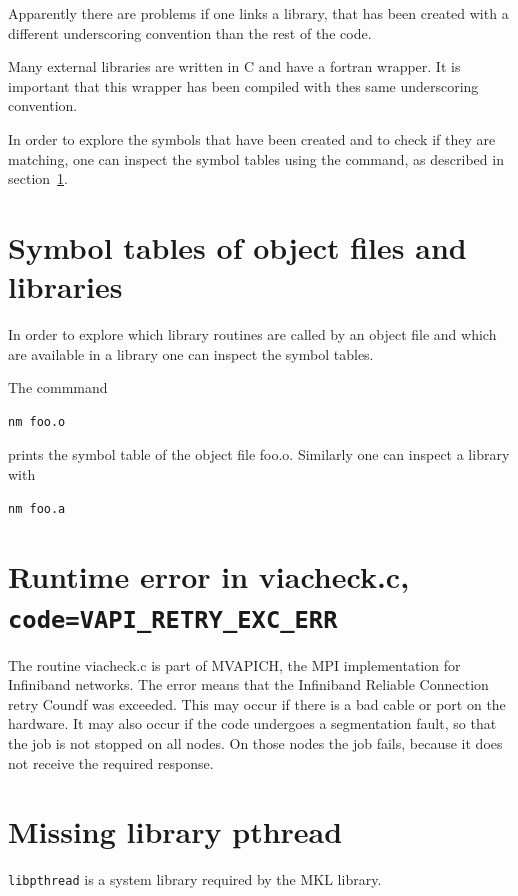 \documentclass[a4paper,10pt]{report}
\newcommand{\mytt}[1]{{\tt #1}}
\begin{document}
Apparently there are problems if one links a library, that has been
created with a different underscoring convention than the rest of the
code.

Many external libraries are written in C and have a fortran wrapper.
It is important that this wrapper has been compiled with thes same
underscoring convention.

In order to explore the symbols that have been created and to check if
they are matching, one can inspect the symbol tables using the
command, as described in section~\ref{sec:nm}.

\section{Symbol tables of object files and libraries}
\label{sec:nm}
In order to explore which library routines are called by an object
file and which are available in a library one can inspect the symbol
tables.

The commmand
\begin{verbatim}
nm foo.o
\end{verbatim}
 prints the symbol table of the object file foo.o.
Similarly one can inspect a library with 
\begin{verbatim}
nm foo.a
\end{verbatim}




\section{Runtime error in viacheck.c, \mytt{code=VAPI\_RETRY\_EXC\_ERR}}
The routine viacheck.c is part of MVAPICH, the MPI implementation for
Infiniband networks. The error means that the Infiniband Reliable
Connection retry Coundf was exceeded. This may occur if there is a bad
cable or port on the hardware. It may also occur if the code undergoes
a segmentation fault, so that the job is not stopped on all nodes. On
those nodes the job fails, because it does not receive the required
response.

\section{Missing library pthread}
\label{sec:problempthread}
\mytt{libpthread} is a system library required by the MKL library.
\end{document}
